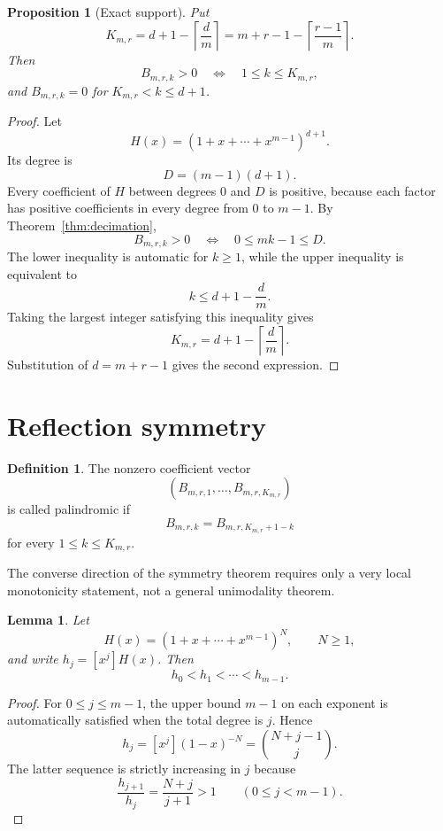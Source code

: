 \documentclass[11pt]{article}
\newtheorem{proposition}[theorem]{Proposition}
\newtheorem{lemma}[theorem]{Lemma}
\theoremstyle{definition}
\newtheorem{definition}[theorem]{Definition}
\theoremstyle{remark}
\begin{document}
\begin{proposition}[Exact support]
\label{prop:support}
Put
\[
 K_{m,r}
 =
 d+1-\left\lceil\frac dm\right\rceil
 =
 m+r-1-\left\lceil\frac{r-1}{m}\right\rceil.
\]
Then
\[
 B_{m,r,k}>0\quad\Longleftrightarrow\quad 1\le k\le K_{m,r},
\]
and $B_{m,r,k}=0$ for $K_{m,r}<k\le d+1$.
\end{proposition}

\begin{proof}
Let
\[
 H(x)=(1+x+\cdots+x^{m-1})^{d+1}.
\]
Its degree is
\[
 D=(m-1)(d+1).
\]
Every coefficient of $H$ between degrees $0$ and $D$ is positive, because
each factor has positive coefficients in every degree from $0$ to $m-1$.
By Theorem~\ref{thm:decimation},
\[
 B_{m,r,k}>0
 \quad\Longleftrightarrow\quad
 0\le mk-1\le D.
\]
The lower inequality is automatic for $k\ge1$, while the upper inequality is
equivalent to
\[
 k\le d+1-\frac dm.
\]
Taking the largest integer satisfying this inequality gives
\[
 K_{m,r}=d+1-\left\lceil\frac dm\right\rceil.
\]
Substitution of $d=m+r-1$ gives the second expression.
\end{proof}

\section{Reflection symmetry}
\label{sec:symmetry}

\begin{definition}
The nonzero coefficient vector
\[
 (B_{m,r,1},\ldots,B_{m,r,K_{m,r}})
\]
is called palindromic if
\[
 B_{m,r,k}=B_{m,r,K_{m,r}+1-k}
\]
for every $1\le k\le K_{m,r}$.
\end{definition}

The converse direction of the symmetry theorem requires only a very local
monotonicity statement, not a general unimodality theorem.

\begin{lemma}
\label{lem:local-monotonicity}
Let
\[
 H(x)=(1+x+\cdots+x^{m-1})^N,\qquad N\ge1,
\]
and write $h_j=[x^j]H(x)$. Then
\[
 h_0<h_1<\cdots<h_{m-1}.
\]
\end{lemma}

\begin{proof}
For $0\le j\le m-1$, the upper bound $m-1$ on each exponent is
automatically satisfied when the total degree is $j$. Hence
\[
 h_j=[x^j](1-x)^{-N}=\binom{N+j-1}{j}.
\]
The latter sequence is strictly increasing in $j$ because
\[
 \frac{h_{j+1}}{h_j}=\frac{N+j}{j+1}>1
 \qquad (0\le j<m-1).
\]
\end{proof}
\end{document}
